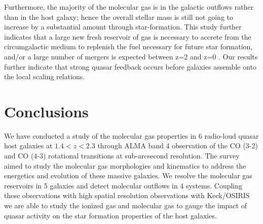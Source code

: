 \documentclass[twocolumn]{aastex63}
\begin{document}
Furthermore, the majority of the molecular gas is in the galactic outflows rather than in the host galaxy; hence the overall stellar mass is still not going to increase by a substantial amount through star-formation. This study further indicates that a large new fresh reservoir of gas is necessary to accrete from the circumgalactic medium to replenish the fuel necessary for future star formation, and/or a large number of mergers is expected between z=2 and z=0 \citep{Burke13,Cooke19}. Our results further indicate that strong quasar feedback occurs before galaxies assemble onto the local scaling relations.


\section{Conclusions}\label{sec:conc}

We have conducted a study of the molecular gas properties in 6 radio-loud quasar host galaxies at $1.4<z<2.3$ through ALMA band 4 observation of the CO (3-2) and CO (4-3) rotational transitions at sub-arcsecond resolution. The survey aimed to study the molecular gas morphologies and kinematics to address the energetics and evolution of these massive galaxies. We resolve the molecular gas reservoirs in 5 galaxies and detect molecular outflows in 4 systems. Coupling these observations with high spatial resolution observations with Keck/OSIRIS we are able to study the ionized gas and molecular gas to gauge the impact of quasar activity on the star formation properties of the host galaxies.
\end{document}
